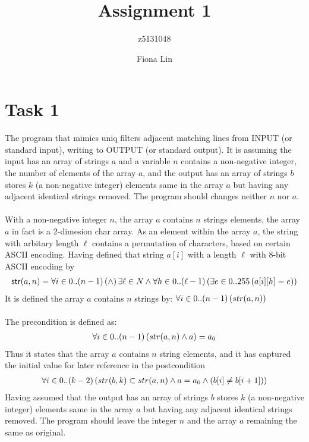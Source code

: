 \documentclass[a4paper,12pt,fleqn]{scrartcl}
\title{Assignment 1}
\author{z5131048\and Fiona Lin}
\newcommand{\str}{\mathsf{str}}
\begin{document}
\maketitle
\section{Task 1}
\label{sec:task-1}

The program that mimics uniq filters adjacent matching lines from INPUT (or standard input), writing to OUTPUT (or standard output). It is assuming the input has an array of strings $a$ and a variable $n$ contains a non-negative integer, the number of elements of the array $a$, and the output has an array of strings $b$ stores $k$ (a non-negative integer) elements same in the array $a$ but having any adjacent identical strings removed. The program should changes neither $n$ nor $a$. \\
\\
With a non-negative integer $n$, the array $a$ contains $n$ strings elements, the array $a$ in fact is a 2-dimesion char array. As an element within the array $a$, the string with arbitary length $\ell$ contains a permutation of characters, based on certain ASCII encoding. Having defined that string $a[i]$ with a length $\ell$ with 8-bit ASCII encoding by\\
\begin{gather*}
	\str(a,n) = \All{i\in 0..(n-1)} \AND {\exists \ell\in N} \And \All{h\in 0..(\ell-1)}{\Exi{e\in 0..255}{a[i][h]=e}}
\end{gather*}
It is defined the array $a$ contains $n$ strings by: \quad $\forall i\in 0..(n-1)\left(str(a,n)\right)$\\
\\
The precondition is defined as:
\begin{gather*}
	\forall i\in 0..(n-1)\left(str(a,n)\wedge a\right)=a_0
\end{gather*}
Thus it states that the array $a$ contains $n$ string elements, and it has captured the initial value for later reference in the postcondition
\begin{gather*}
\forall i\in 0..(k-2)\left(str(b,k) \subset str(a,n) \wedge a = a_0 \wedge (b[i] \neq b[i+1])\right)
\end{gather*}
Having assumed that the output has an array of strings $b$ stores $k$ (a non-negative integer) elements same in the array $a$ but having any adjacent identical strings removed. The program should leave the integer $n$ and the array $a$ remaining the same as original.
\\
\end{document}

